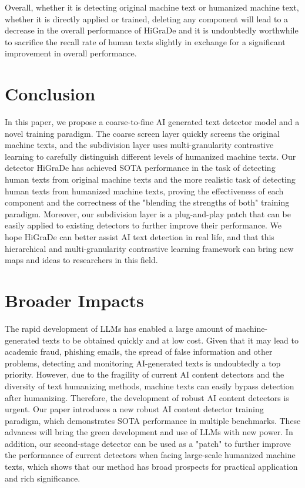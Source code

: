 \documentclass[11pt]{article}
\begin{document}
			Overall, whether it is detecting original machine text or humanized machine text, whether it is directly applied or trained, deleting any component will lead to a decrease in the overall performance of HiGraDe and it is undoubtedly worthwhile to sacrifice the recall rate of human texts slightly in exchange for a significant improvement in overall performance.
			
	\section{Conclusion}
	In this paper, we propose a coarse-to-fine AI generated text detector model and a novel training paradigm. The coarse screen layer quickly screens the original machine texts, and the subdivision layer uses multi-granularity contrastive learning to carefully distinguish different levels of humanized machine texts. Our detector HiGraDe has achieved SOTA performance in the task of detecting human texts from original machine texts and the more realistic task of detecting human texts from humanized machine texts, proving the effectiveness of each component and the correctness of the "blending the strengths of both" training paradigm. Moreover, our subdivision layer is a plug-and-play patch that can be easily applied to existing detectors to further improve their performance. We hope HiGraDe can better assist AI text detection in real life, and that this hierarchical and multi-granularity contrastive learning framework can bring new maps and ideas to researchers in this field.

	\newpage
	
	
	\newpage
	\appendix
	\section{Broader Impacts}
	\label{sec:Impacts}
	The rapid development of LLMs has enabled a large amount of machine-generated texts to be obtained quickly and at low cost. Given that it may lead to academic fraud, phishing emails, the spread of false information and other problems, detecting and monitoring AI-generated texts is undoubtedly a top priority. However, due to the fragility of current AI content detectors and the diversity of text humanizing methods, machine texts can easily bypass detection after humanizing. Therefore, the development of robust AI content detectors is urgent. Our paper introduces a new robust AI content detector training paradigm, which demonstrates SOTA performance in multiple benchmarks. These advances will bring the green development and use of LLMs with new power. In addition, our second-stage detector can be used as a "patch" to further improve the performance of current detectors when facing large-scale humanized machine texts, which shows that our method has broad prospects for practical application and rich significance.
\end{document}
